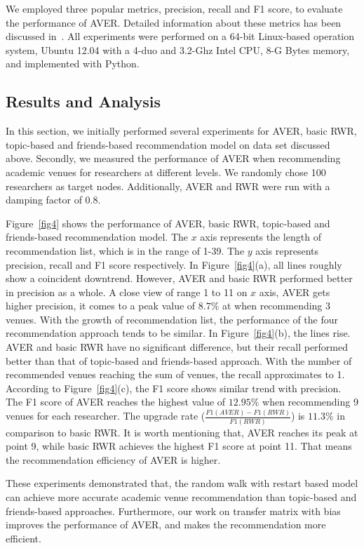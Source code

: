 \documentclass[9pt]{acm_proc_article-sp}
\begin{document}
We employed three popular metrics, precision, recall and F1 score, to evaluate the performance of AVER. Detailed information about these metrics has been discussed in~\cite{xia2014mvcwalker}. All experiments were performed on a 64-bit Linux-based operation system, Ubuntu 12.04 with a 4-duo and 3.2-Ghz Intel CPU, 8-G Bytes memory, and implemented with Python.

\subsection{Results and Analysis}
In this section, we initially performed several experiments for AVER, basic RWR, topic-based and friends-based recommendation model on data set discussed above. Secondly, we measured the performance of AVER when recommending academic venues for researchers at different levels. We randomly chose 100 researchers as target nodes. Additionally, AVER and RWR were run with a damping factor of 0.8.

Figure~\ref{fig4} shows the performance of AVER, basic RWR, topic-based and friends-based recommendation model. The $x$ axis represents the length of recommendation list, which is in the range of 1-39. The $y$ axis represents precision, recall and F1 score respectively. In Figure~\ref{fig4}(a), all lines roughly show a coincident downtrend. However, AVER and basic RWR performed better in precision as a whole. A close view of range 1 to 11 on $x$ axis, AVER gets higher precision, it comes to a peak value of $8.7\%$ at when recommending 3 venues. With the growth of recommendation list, the performance of the four recommendation approach tends to be similar. In Figure~\ref{fig4}(b), the lines rise. AVER and basic RWR have no significant difference, but their recall performed better than that of topic-based and friends-based approach. With the number of recommended venues reaching the sum of venues, the recall approximates to 1. According to Figure~\ref{fig4}(c), the F1 score shows similar trend with precision. The F1 score of AVER reaches the highest value of $12.95\%$ when recommending 9 venues for each researcher. The upgrade rate ($\frac{F1(AVER)-F1(RWR)}{F1(RWR)}$) is $11.3\%$ in comparison to basic RWR. It is worth mentioning that, AVER reaches its peak at point 9, while basic RWR achieves the highest F1 score at point 11. That means the recommendation efficiency of AVER is higher.

These experiments demonstrated that, the random walk with restart based model can achieve more accurate academic venue recommendation than topic-based and friends-based approaches. Furthermore, our work on transfer matrix with bias improves the performance of AVER, and makes the recommendation more efficient.
\end{document}

